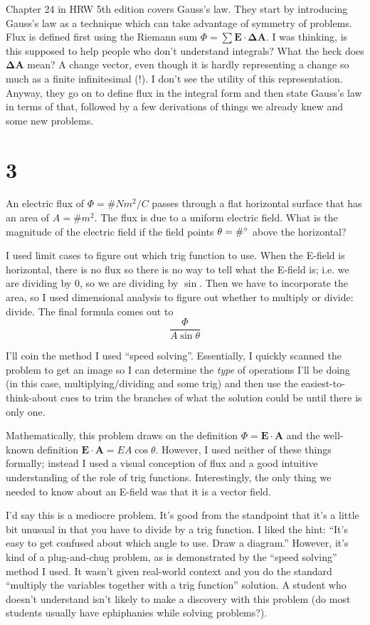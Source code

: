 \documentclass[11pt]{article}
\begin{document}
Chapter 24 in HRW 5th edition covers Gauss's law.  They start by
introducing Gauss's law as a technique which can take advantage of
symmetry of problems.  Flux is defined first using the Riemann sum $\Phi
= \sum \mathbf{E}\cdot\mathbf{\Delta A}$.  I was thinking, is this
supposed to help people who don't understand integrals?  What the heck
does $\mathbf{\Delta A}$ mean?  A change vector, even though it is
hardly representing a change so much as a finite infinitesimal (!).  I
don't see the utility of this representation. Anyway, they go on to
define flux in the integral form and then state Gauss's law in terms of
that, followed by a few derivations of things we already knew and some
new problems.

\section*{3}
An electric flux of $\Phi = \# Nm^2/C$ passes through a flat horizontal
surface that has an area of $A = \# m^2$.  The flux is due to a
uniform electric field.  What is the magnitude of the electric field if
the field points $\theta = \# \degree$ above the horizontal?

I used limit cases to figure out which trig function to use.  When the
E-field is horizontal, there is no flux so there is no way to tell what
the E-field is; i.e. we are dividing by 0, so we are dividing by $\sin$.
Then we have to incorporate the area, so I used dimensional analysis to
figure out whether to multiply or divide: divide.  The final formula
comes out to
\[ \frac{\Phi}{A \sin{\theta}} \]

I'll coin the method I used ``speed solving''.  Essentially, I quickly
scanned the problem to get an image so I can determine the \textit{type}
of operations I'll be doing (in this case, multiplying/dividing and some
trig) and then use the easiest-to-think-about cues to trim the branches
of what the solution could be until there is only one.

Mathematically, this problem draws on the definition $\Phi =
\mathbf{E}\cdot\mathbf{A}$ and the well-known definition
$\mathbf{E}\cdot\mathbf{A} = EA\cos{\theta}$.  However, I used neither
of these things formally; instead I used a visual conception of flux and
a good intuitive understanding of the role of trig functions.
Interestingly, the only thing we needed to know about an E-field was
that it is a vector field.

I'd say this is a mediocre problem.  It's good from the standpoint that
it's a little bit unusual in that you have to divide by a trig function.
I liked the hint: ``It's easy to get confused about which angle to use.
Draw a diagram.''  However, it's kind of a plug-and-chug problem, as is
demonstrated by the ``speed solving'' method I used.  It wasn't given
real-world context and you do the standard ``multiply the variables
together with a trig function'' solution.  A student who doesn't
understand isn't likely to make a discovery with this problem (do
most students usually have ephiphanies while solving problems?).
\end{document}

